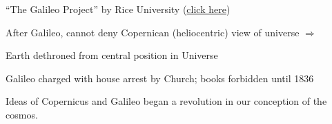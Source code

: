 \documentclass[main.tex]{subfiles}
\begin{document}
 ``The Galileo Project'' by Rice University (\href{http://galileo.rice.edu/}{click here})

After Galileo, cannot deny Copernican (heliocentric) view of universe $\Rightarrow$ 

Earth dethroned from central position in Universe

Galileo charged with house arrest by Church; books forbidden until 1836

Ideas of Copernicus and Galileo began a revolution in our conception of the cosmos.

\clearpage


\printnoidxglossaries
\end{document}
